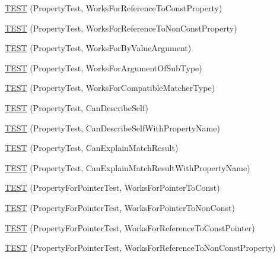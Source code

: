\begin{DoxyCompactItemize}
\item 
\mbox{\hyperlink{namespacetesting_1_1gmock__matchers__test_a7254899c6d45df648d5b4ef6eece3ae0}{T\+E\+ST}} (Property\+Test, Works\+For\+Reference\+To\+Const\+Property)
\item 
\mbox{\hyperlink{namespacetesting_1_1gmock__matchers__test_a5b7b02e8fcef1aff9a4afc81d5fb5d5f}{T\+E\+ST}} (Property\+Test, Works\+For\+Reference\+To\+Non\+Const\+Property)
\item 
\mbox{\hyperlink{namespacetesting_1_1gmock__matchers__test_af703b24e2bee13cf7a042f699809a5ab}{T\+E\+ST}} (Property\+Test, Works\+For\+By\+Value\+Argument)
\item 
\mbox{\hyperlink{namespacetesting_1_1gmock__matchers__test_a38a5ad623dda9ef0f48ebaf65485d18e}{T\+E\+ST}} (Property\+Test, Works\+For\+Argument\+Of\+Sub\+Type)
\item 
\mbox{\hyperlink{namespacetesting_1_1gmock__matchers__test_a17b7a59d1dbca0692ebaa71e6f46f1d6}{T\+E\+ST}} (Property\+Test, Works\+For\+Compatible\+Matcher\+Type)
\item 
\mbox{\hyperlink{namespacetesting_1_1gmock__matchers__test_a8c749e210723e33547e58fe8822fb85e}{T\+E\+ST}} (Property\+Test, Can\+Describe\+Self)
\item 
\mbox{\hyperlink{namespacetesting_1_1gmock__matchers__test_abcfb6f5efcd420b9acfeb1e9930a8dc2}{T\+E\+ST}} (Property\+Test, Can\+Describe\+Self\+With\+Property\+Name)
\item 
\mbox{\hyperlink{namespacetesting_1_1gmock__matchers__test_aff810d2cdd79c55d483965a28bb5069a}{T\+E\+ST}} (Property\+Test, Can\+Explain\+Match\+Result)
\item 
\mbox{\hyperlink{namespacetesting_1_1gmock__matchers__test_acd0d13c244310aeed3eb2dacccee644e}{T\+E\+ST}} (Property\+Test, Can\+Explain\+Match\+Result\+With\+Property\+Name)
\item 
\mbox{\hyperlink{namespacetesting_1_1gmock__matchers__test_ac9222439b8e0b1e080650d667044c140}{T\+E\+ST}} (Property\+For\+Pointer\+Test, Works\+For\+Pointer\+To\+Const)
\item 
\mbox{\hyperlink{namespacetesting_1_1gmock__matchers__test_acc639f3cbeacf4af712bf02ac451b160}{T\+E\+ST}} (Property\+For\+Pointer\+Test, Works\+For\+Pointer\+To\+Non\+Const)
\item 
\mbox{\hyperlink{namespacetesting_1_1gmock__matchers__test_a028687dfb04ec008ea129f9cc95aac62}{T\+E\+ST}} (Property\+For\+Pointer\+Test, Works\+For\+Reference\+To\+Const\+Pointer)
\item 
\mbox{\hyperlink{namespacetesting_1_1gmock__matchers__test_a78762b60c9d0c985916b698e6d4c55e3}{T\+E\+ST}} (Property\+For\+Pointer\+Test, Works\+For\+Reference\+To\+Non\+Const\+Property)

\end{DoxyCompactItemize}
